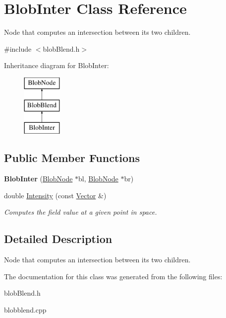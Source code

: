 \hypertarget{class_blob_inter}{
\section{BlobInter Class Reference}
\label{class_blob_inter}
}


Node that computes an intersection between its two children.  




{\ttfamily \#include $<$blobBlend.h$>$}

Inheritance diagram for BlobInter:\begin{figure}[H]
\begin{center}
\leavevmode
\includegraphics[height=3.000000cm]{class_blob_inter}
\end{center}
\end{figure}
\subsection*{Public Member Functions}
\begin{DoxyCompactItemize}
\item 
\hypertarget{class_blob_inter_a8cfcee104a50b841a465da8bf57e5d37}{
{\bfseries BlobInter} (\hyperlink{class_blob_node}{BlobNode} $\ast$bl, \hyperlink{class_blob_node}{BlobNode} $\ast$br)}
\label{class_blob_inter_a8cfcee104a50b841a465da8bf57e5d37}

\item 
\hypertarget{class_blob_inter_a2858484f146634c44857484e87481992}{
double \hyperlink{class_blob_inter_a2858484f146634c44857484e87481992}{Intensity} (const \hyperlink{class_vector}{Vector} \&)}
\label{class_blob_inter_a2858484f146634c44857484e87481992}

\begin{DoxyCompactList}\small\item\em Computes the field value at a given point in space. \item\end{DoxyCompactList}\end{DoxyCompactItemize}


\subsection{Detailed Description}
Node that computes an intersection between its two children. 

The documentation for this class was generated from the following files:\begin{DoxyCompactItemize}
\item 
blobBlend.h\item 
blobblend.cpp\end{DoxyCompactItemize}

